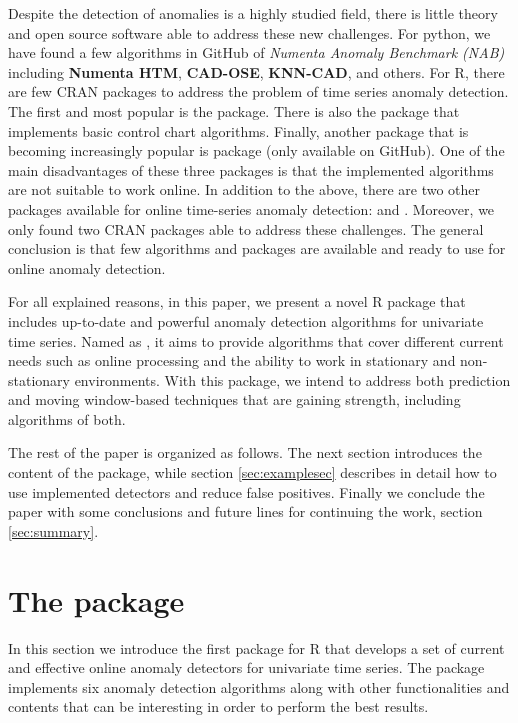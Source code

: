 \documentclass[a4paper]{article}\usepackage[]{graphicx}\usepackage[]{color}
\begin{document}
Despite the detection of anomalies is a highly studied field, there is little theory and open source software able to address these new challenges. For python, we have found a few algorithms in GitHub of \emph{Numenta Anomaly Benchmark (NAB)} \cite{7424283} including \textbf{Numenta HTM}, \textbf{CAD-OSE}, \textbf{KNN-CAD}, and others. For R, there are few CRAN packages to address the problem of time series anomaly detection. The first and most popular is the  package. There is also the  package that implements basic control chart algorithms. Finally, another package that is becoming increasingly popular is  package (only available on GitHub). One of the main disadvantages of these three packages is that the implemented algorithms are not suitable to work online. In addition to the above, there are two other packages available for online time-series anomaly detection:  and . Moreover, we only found two CRAN packages able to address these challenges. The general conclusion is that few algorithms and packages are available and ready to use for online anomaly detection.

For all explained reasons, in this paper, we present a novel R package that includes up-to-date and powerful anomaly detection algorithms for univariate time series. Named as , it aims to provide algorithms that cover different current needs such as online processing and the ability to work in stationary and non-stationary environments. With this package, we intend to address both prediction and moving window-based techniques that are gaining strength, including algorithms of both.

The rest of the paper is organized as follows. The next section introduces the content of the  package, while section \ref{sec:examplesec} describes in detail how to use implemented detectors and reduce false positives. Finally we conclude the paper with some conclusions and future lines for continuing the work, section \ref{sec:summary}.

\section{The  package}\label{sec:package}

In this section we introduce the first package for R that develops a set of current and effective online anomaly detectors for univariate time series. The  package implements six anomaly detection algorithms along with other functionalities and contents that can be interesting in order to perform the best results.
\end{document}
